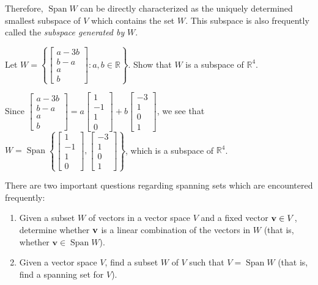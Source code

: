 \documentclass[12pt,letterpaper,reqno]{article}
\numberwithin{equation}{section}
\DeclareMathOperator{\Span}{Span}
\begin{document}
Therefore, $\Span W$ can be directly characterized as the uniquely determined smallest subspace of $V$ which contains the set $W$. This subspace is also frequently called the \emph{subspace generated by} $W$.

\begin{exercise}
Let $W=\left\{\begin{bmatrix}a-3b \\ b-a \\ a \\ b\end{bmatrix}:a,b \in \mathbb{R}\right\}$. Show that $W$ is a subspace of $\mathbb{R}^4$.	
\end{exercise}

{\color{red}\begin{solution}
	Since $\begin{bmatrix}a-3b \\ b-a \\ a \\ b\end{bmatrix}=a\begin{bmatrix}
		1 \\ -1 \\ 1 \\ 0
	\end{bmatrix}+b\begin{bmatrix}
		-3 \\ 1 \\ 0 \\ 1
	\end{bmatrix}$, we see that $W=\Span\left\{\begin{bmatrix}
		1 \\ -1 \\ 1 \\ 0
	\end{bmatrix}, \begin{bmatrix}
		-3 \\ 1 \\ 0 \\ 1
	\end{bmatrix}\right\}$, which is a subspace of $\mathbb{R}^4$.
\end{solution}}

There are two important questions regarding spanning sets which are encountered frequently:
\begin{enumerate}
	\item Given a subset $W$ of vectors in a vector space $V$ and a fixed vector ${\bf v} \in V$, determine whether ${\bf v}$ is a linear combination of the vectors in $W$ (that is, whether $\mathbf{v} \in \Span W$).
	\item Given a vector space $V$, find a subset $W$ of $V$ such that $V=\Span W$ (that is, find a spanning set for $V$).
\end{enumerate}
\end{document}
